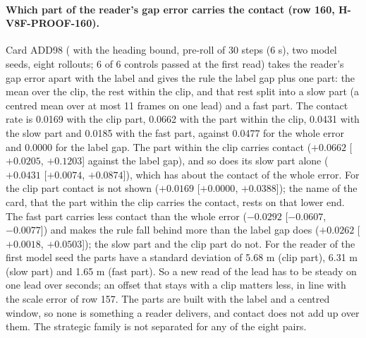 \paragraph{Which part of the reader's gap error carries the contact (row 160, H-V8F-PROOF-160).} Card ADD98 ( with the heading bound, pre-roll of 30 steps (6 s), two model seeds, eight rollouts; 6 of 6 controls passed at the first read) takes the reader's gap error apart with the label and gives the rule the label gap plus one part: the mean over the clip, the rest within the clip, and that rest split into a slow part (a centred mean over at most 11 frames on one lead) and a fast part. The contact rate is 0.0169 with the clip part, 0.0662 with the part within the clip, 0.0431 with the slow part and 0.0185 with the fast part, against 0.0477 for the whole error and 0.0000 for the label gap. The part within the clip carries contact ($+0.0662$ [$+0.0205$, $+0.1203$] against the label gap), and so does its slow part alone ($+0.0431$ [$+0.0074$, $+0.0874$]), which has about the contact of the whole error. For the clip part contact is not shown ($+0.0169$ [$+0.0000$, $+0.0388$]); the name of the card, that the part within the clip carries the contact, rests on that lower end. The fast part carries less contact than the whole error ($-0.0292$ [$-0.0607$, $-0.0077$]) and makes the rule fall behind more than the label gap does ($+0.0262$ [$+0.0018$, $+0.0503$]); the slow part and the clip part do not. For the reader of the first model seed the parts have a standard deviation of 5.68 m (clip part), 6.31 m (slow part) and 1.65 m (fast part). So a new read of the lead has to be steady on one lead over seconds; an offset that stays with a clip matters less, in line with the scale error of row 157. The parts are built with the label and a centred window, so none is something a reader delivers, and contact does not add up over them. The strategic family is not separated for any of the eight pairs.

